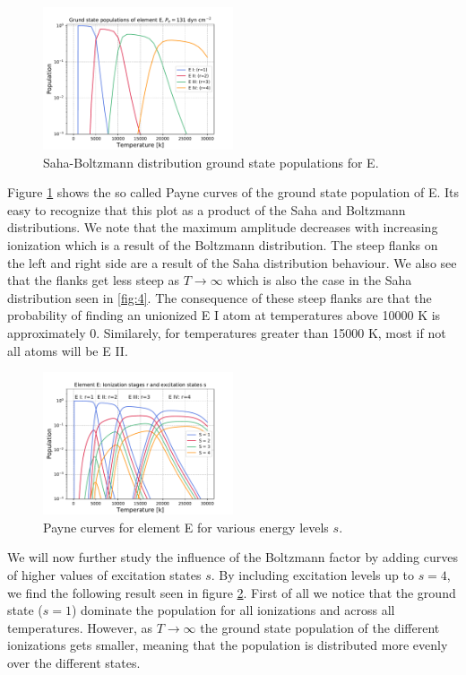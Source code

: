 \documentclass[a4paper,11.5pt,]{article}
\begin{document}
\begin{multicols}{2}
\begin{figure}[H]
	\centering
	\includegraphics[width=0.5\textwidth]{figures/payne_E.pdf}
	\caption{Saha-Boltzmann distribution ground state populations for E.}
	\label{fig:5}
\end{figure}
\noindent Figure \ref{fig:5} shows the so called Payne curves of the ground state population of E. Its easy to recognize that this plot as a product of the Saha and Boltzmann distributions. We note that the maximum amplitude decreases with increasing ionization which is a result of the Boltzmann distribution. The steep flanks on the left and right side are a result of the Saha distribution behaviour. We also see that the flanks get less steep as $T \rightarrow \infty$ which is also the case in the Saha distribution seen in \ref{fig:4}. The consequence of these steep flanks are that the probability of finding an unionized E I atom at temperatures above 10000 K is approximately 0. Similarely, for temperatures greater than 15000 K, most if not all atoms will be E II.
\begin{figure}[H]
	\centering
	\includegraphics[width=0.5\textwidth]{figures/payne_E_multi.pdf}
	\caption{Payne curves for element E for various energy levels $s$. }
	\label{fig:6}
\end{figure}

\noindent We will now further study the influence of the Boltzmann factor by adding curves of higher values of excitation states $s$. By including excitation levels up to $s=4$, we find the following result seen in figure \ref{fig:6}. First of all we notice that the ground state ($s=1$) dominate the population for all ionizations and across all temperatures. However, as $T \rightarrow \infty$ the ground state population of the different ionizations gets smaller, meaning that the population is distributed more evenly over the different states.


\end{multicols}
\end{document}

